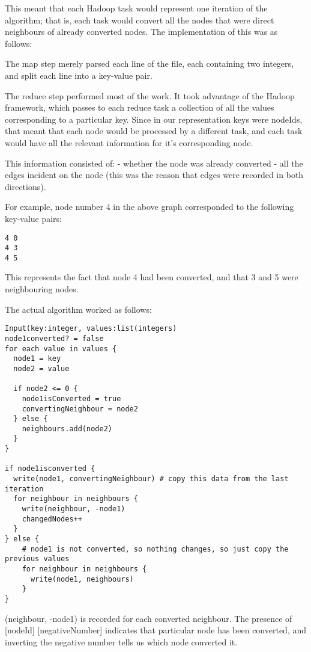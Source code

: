 This meant that each Hadoop task would represent one iteration of the algorithm; that is, each task would convert all the nodes that were direct neighbours of already converted nodes. The implementation of this was as follows:

The map step merely parsed each line of the file, each containing two integers, and split each line into a key-value pair.

The reduce step performed most of the work. It took advantage of the Hadoop framework, which passes to each reduce task a collection of all the values corresponding to a particular key. Since in our representation keys were nodeIds, that meant that each node would be processed by a different task, and each task would have all the relevant information for it's corresponding node.

This information consisted of:
- whether the node was already converted
- all the edges incident on the node (this was the reason that edges were recorded in both directions).

For example, node number 4 in the above graph corresponded to the following key-value pairs:

\begin{verbatim}
4 0
4 3
4 5
\end{verbatim}

This represents the fact that node 4 had been converted, and that 3 and 5 were neighbouring nodes.

The actual algorithm worked as follows:

\begin{verbatim}
Input(key:integer, values:list(integers)
node1converted? = false
for each value in values {
  node1 = key
  node2 = value

  if node2 <= 0 {
    node1isConverted = true
    convertingNeighbour = node2
  } else {
    neighbours.add(node2)
  }
}

if node1isconverted {
  write(node1, convertingNeighbour) # copy this data from the last iteration
  for neighbour in neighbours {
    write(neighbour, -node1)
    changedNodes++
  } 
} else {
    # node1 is not converted, so nothing changes, so just copy the previous values
    for neighbour in neighbours {
      write(node1, neighbours)
    }            
}
\end{verbatim}

(neighbour, -node1) is recorded for each converted neighbour. The presence of [nodeId] [negativeNumber] indicates that particular node has been converted, and inverting the negative number tells us which node converted it.

